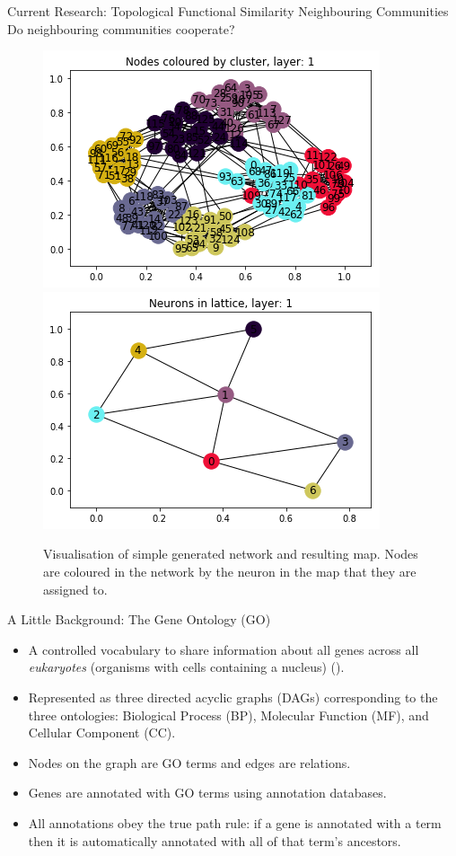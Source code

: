 \documentclass{beamer}
\begin{document}
	\begin{frame}{Current Research: Topological Functional Similarity Neighbouring Communities}
		Do neighbouring communities cooperate?
		\begin{figure}
			\centering
			\includegraphics[scale=0.4]{figure2_network.png}
			\includegraphics[scale=0.4]{figure2_map.png}
			\caption{Visualisation of simple generated network and resulting map. Nodes are coloured in the network by the neuron in the map that they are assigned to.}
			\label{colouring}
		\end{figure}
	\end{frame}
	
	\begin{frame}{A Little Background: The Gene Ontology (GO)}
		
		\begin{itemize}
			\item A controlled vocabulary to share information about all genes across all \textit{eukaryotes} (organisms with cells containing a nucleus) (\cite{ashburner2000gene}).
			\item Represented as three directed acyclic graphs (DAGs) corresponding to the three ontologies: Biological Process (BP), Molecular Function (MF), and Cellular Component (CC).
			\item Nodes on the graph are GO terms and edges are relations.
			\item Genes are annotated with GO terms using annotation databases.
			\item All annotations obey the true path rule: if a gene is annotated with a term then it is automatically annotated with all of that term's ancestors.  
		\end{itemize}
		
	\end{frame}
	
\end{document}
